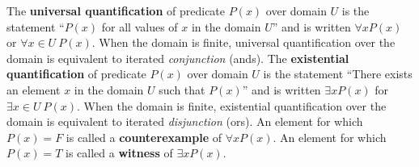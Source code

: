 \documentclass[12pt, oneside]{article}
\begin{document}
\begin{flushright}
\end{flushright}The {\bf universal quantification} of predicate $P(x)$ over
domain $U$ is the statement ``$P(x)$ for all values of $x$ in the domain $U$''
and is written $\forall x P(x)$ or $\forall x \in U ~P(x)$. 
When the domain is finite, universal quantification over the domain 
is equivalent to iterated {\it conjunction} (ands).
The {\bf existential quantification} of predicate $P(x)$ 
over domain $U$ is the statement ``There exists an element $x$ 
in the domain $U$ such that $P(x)$'' and is written $\exists x P(x)$
for $\exists x \in U ~P(x)$. 
When the domain is finite, existential quantification over the domain 
is equivalent to iterated {\it disjunction} (ors).
An element for which $P(x) = F$ is called a {\bf counterexample} of $\forall x P(x)$.
An element for which $P(x) = T$ is called a {\bf witness} of $\exists x P(x)$.
\end{document}
